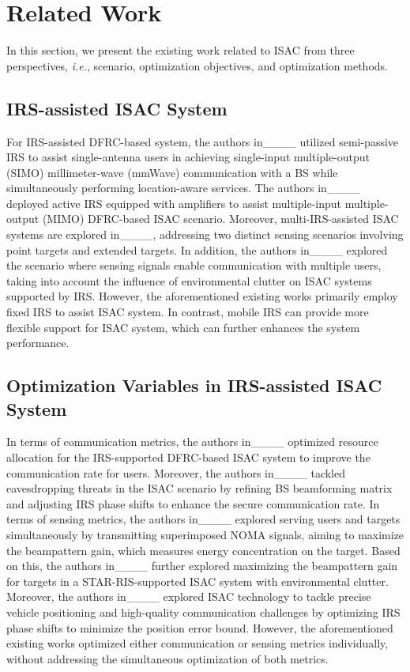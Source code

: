 \section{Related Work}
\label{sec: Related Work}

\par In this section, we present the existing work related to ISAC from three perspectives, \textit{i.e.}, scenario, optimization objectives, and optimization methods.

\subsection{IRS-assisted ISAC System}
\par For IRS-assisted DFRC-based system, the authors in____ utilized semi-passive IRS to assist single-antenna users in achieving single-input multiple-output (SIMO) millimeter-wave (mmWave) communication with a BS while simultaneously performing location-aware services. The authors in____ deployed active IRS equipped with amplifiers to assist multiple-input multiple-output (MIMO) DFRC-based ISAC scenario. Moreover, multi-IRS-assisted ISAC systems are explored in____, addressing two distinct sensing scenarios involving point targets and extended targets. In addition, the authors in____ explored the scenario where sensing signals enable communication with multiple users, taking into account the influence of environmental clutter on ISAC systems supported by IRS. However, the aforementioned existing works primarily employ fixed IRS to assist ISAC system. In contrast, mobile IRS can provide more flexible support for ISAC system, which can further enhances the system performance.

\subsection{Optimization Variables in IRS-assisted ISAC System}
\par In terms of communication metrics, the authors in____ optimized resource allocation for the IRS-supported DFRC-based ISAC system to improve the communication rate for users. Moreover, the authors in____ tackled eavesdropping threats in the ISAC scenario by refining BS beamforming matrix and adjusting IRS phase shifts to enhance the secure communication rate. In terms of sensing metrics, the authors in____ explored serving users and targets simultaneously by transmitting superimposed NOMA signals, aiming to maximize the beampattern gain, which measures energy concentration on the target. Based on this, the authors in____ further explored maximizing the beampattern gain for targets in a STAR-RIS-supported ISAC system with environmental clutter. Moreover, the authors in____ explored ISAC technology to tackle precise vehicle positioning and high-quality communication challenges by optimizing IRS phase shifts to minimize the position error bound. However, the aforementioned existing works optimized either communication or sensing metrics individually, without addressing the simultaneous optimization of both metrics.

